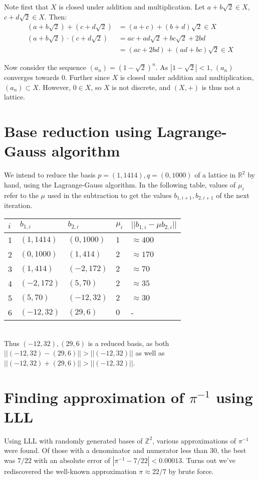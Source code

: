 \documentclass[a4paper]{scrreprt}
\begin{document}
Note first that $X$ is closed under addition and multiplication. Let $a + b
\sqrt{2} \in X$, $c + d \sqrt{2} \in X$. Then:
\begin{align*}
		(a + b \sqrt{2}) + (c + d \sqrt{2}) & = (a + c) + (b + d) \sqrt{2} \in X \\
		(a + b \sqrt{2}) \cdot (c + d \sqrt{2}) & = ac + ad \sqrt{2} + bc \sqrt{2} + 2bd \\
												& = (ac + 2bd) + (ad + bc) \sqrt{2} \in X
\end{align*}

Now consider the sequence $(a_n) = \left(1 - \sqrt{2}\right)^n$. As $\left|1 -
\sqrt{2}\right| < 1$, $(a_n)$ converges towards $0$. Further since $X$ is
closed under addition and multiplication, $(a_n) \subset X$. However, $0 \in
X$, so $X$ is not discrete, and $(X, +)$ is thus not a lattice.

\section{Base reduction using Lagrange-Gauss algorithm}

We intend to reduce the basis $p = (1, 1414), q = (0, 1000)$ of a lattice in
$\mathbb{R}^2$ by hand, using the Lagrange-Gauss algorithm. In the following
table, values of $\mu_i$ refer to the $\mu$ used in the subtraction to get the
values $b_{1, i+1}, b_{2, i+1}$ of the next iteration. \\

\begin{tabular}{lllll}
		\toprule
		$i$ & $b_{1, i}$ & $b_{2, i}$ & $\mu_{i}$ & $||b_{1, i} - \mu b_{2, i}||$ \\
		\midrule
		1 & $(1, 1414)$ & $(0, 1000)$ & $1$ & $\approx 400$ \\
		2 & $(0, 1000)$ & $(1, 414)$  & $2$ & $\approx 170$ \\
		3 & $(1, 414)$  & $(-2, 172)$ & $2$ & $\approx 70$ \\
		4 & $(-2, 172)$ & $(5, 70)$   & $2$ & $\approx 35$ \\
		5 & $(5, 70)$   & $(-12, 32)$ & $2$ & $\approx 30$ \\
		6 & $(-12, 32)$ & $(29, 6)$   & $0$ & - \\
		\bottomrule
\end{tabular}\\

Thus $(-12, 32), (29, 6)$ is a reduced basis, as both $||(-12, 32) - (29, 6)||
> ||(-12, 32)||$ as well as $||(-12, 32) + (29, 6)|| > ||(-12, 32)||$.

\section{Finding approximation of $\pi^{-1}$ using LLL}

Using LLL with randomly generated bases of $\mathbb{Z}^2$, various
approximations of $\pi^{-1}$ were found. Of those with a denominator and
numerator less than 30, the best was $7/22$ with an absolute error of
$|\pi^{-1} - 7/22| < 0.00013$. Turns out we've rediscovered the well-known
approximation $\pi \approx 22/7$ by brute force.

\printbibliography{}
\end{document}
